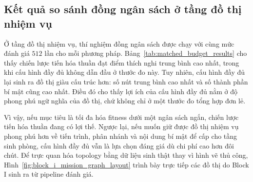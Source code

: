 \documentclass[oneside,a4paper,12pt]{extreport}
\begin{document}
\subsection{Kết quả so sánh đồng ngân sách ở tầng đồ thị nhiệm vụ}
Ở tầng đồ thị nhiệm vụ, thí nghiệm đồng ngân sách được chạy với cùng mức đánh giá $512$ lần cho mỗi phương pháp. Bảng~\ref{tab:matched_budget_results} cho thấy chiến lược tiến hóa thuần đạt điểm thích nghi trung bình cao nhất, trong khi cấu hình đầy đủ không dẫn đầu ở thước đo này. Tuy nhiên, cấu hình đầy đủ lại sinh ra đồ thị giàu cấu trúc hơn: số nút trung bình cao nhất và số thành phần bí mật cũng cao nhất. Điều đó cho thấy lợi ích của cấu hình đầy đủ nằm ở độ phong phú ngữ nghĩa của đồ thị, chứ không chỉ ở một thước đo tổng hợp đơn lẻ.

\begin{table}[H]
\centering
\small
\setlength{\tabcolsep}{4pt}
\renewcommand{\arraystretch}{1.08}
\caption{So sánh đồng ngân sách ở tầng đồ thị nhiệm vụ}
\label{tab:matched_budget_results}
\end{table}

Vì vậy, nếu mục tiêu là tối đa hóa fitness dưới một ngân sách ngắn, chiến lược tiến hóa thuần đang có lợi thế. Ngược lại, nếu muốn giữ được đồ thị nhiệm vụ phong phú hơn về tiến trình, phân nhánh và nội dung bí mật để cấp cho tầng sinh phòng, cấu hình đầy đủ vẫn là lựa chọn đáng giá dù chi phí cao hơn đôi chút. Để trực quan hóa topology bằng dữ liệu sinh thật thay vì hình vẽ thủ công, Hình~\ref{fig:block_i_mission_graph_layout} trình bày trực tiếp các đồ thị do Block I sinh ra từ pipeline đánh giá.
\end{document}
